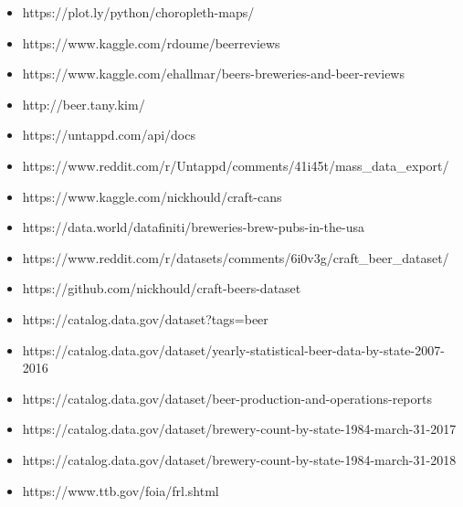 \documentclass[11pt]{article}
\providecommand{\tightlist}{%
      \setlength{\itemsep}{0pt}\setlength{\parskip}{0pt}}
\begin{document}
\begin{itemize}
\tightlist
\item
  https://plot.ly/python/choropleth-maps/
\item
  https://www.kaggle.com/rdoume/beerreviews
\item
  https://www.kaggle.com/ehallmar/beers-breweries-and-beer-reviews
\item
  http://beer.tany.kim/
\item
  https://untappd.com/api/docs
\item
  https://www.reddit.com/r/Untappd/comments/41i45t/mass\_data\_export/
\item
  https://www.kaggle.com/nickhould/craft-cans
\item
  https://data.world/datafiniti/breweries-brew-pubs-in-the-usa
\item
  https://www.reddit.com/r/datasets/comments/6i0v3g/craft\_beer\_dataset/
\item
  https://github.com/nickhould/craft-beers-dataset
\item
  https://catalog.data.gov/dataset?tags=beer
\item
  https://catalog.data.gov/dataset/yearly-statistical-beer-data-by-state-2007-2016
\item
  https://catalog.data.gov/dataset/beer-production-and-operations-reports
\item
  https://catalog.data.gov/dataset/brewery-count-by-state-1984-march-31-2017
\item
  https://catalog.data.gov/dataset/brewery-count-by-state-1984-march-31-2018
\item
  https://www.ttb.gov/foia/frl.shtml
\end{itemize}


    
    
    
    
\end{document}
